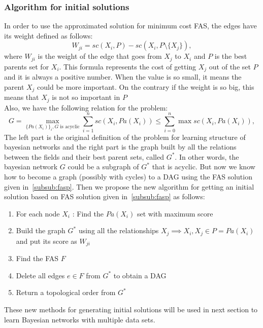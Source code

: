 \subsubsection{Algorithm for initial solutions}
\label{subsub:fasalgorithm}
	In order to use the approximated solution for minimum cost FAS, the edges have its weight defined as follows:
		\begin{equation}
			\label{eq:weight}
			W_{ji} = {sc}( X_i , P ) - {sc}( X_i , P \setminus \{ X_j \} ) ,
		\end{equation}
	where $W_{ji}$ is the weight of the edge that goes from $X_j$ to $X_i$ and $P$ is the best parents set for $X_i$. This formula represents the cost of getting $X_j$ out of the set $P$ and it is always a positive number. When the value is so small, it means the parent $X_j$ could be more important. On the contrary if the weight is so big, this means that $X_j$ is not so important in $P$\\
	Also, we have the following relation for the problem:
		\begin{equation}
			\label{eq:reduction}
			G = \max_{\{ {Pa}(X_i)\}_i, G \text{ is acyclic}} \sum_{i=1}^n {sc}( X_i , {Pa}( X_i ) ) \leq \sum_{i=0}^{n} \max {sc}( X_i , {Pa}( X_i ) ) ,
		\end{equation}
	The left part is the original definition of the problem for learning structure of bayesian networks and the right part is the graph built by all the relations between the fields and their best parent sets, called $G^*$. In other words, the bayesian network $G$ could be a subgraph of $G^*$ that is acyclic. But now we know how to become a graph (possibly with cycles) to a DAG using the FAS solution given in~\ref{subsub:fasp}.
	Then we propose the new algorithm for getting an initial solution based on FAS solution given in~\ref{subsub:fasp} as follows:
	\begin{enumerate}
		\item For each node $X_i$ : Find the ${Pa}( X_i )$ set with maximum score
		\item Build the graph $G^*$ using all the relationships $X_j \implies X_i, X_j \in P = {Pa}( X_i )$ and put its score as $W_{ji}$
		\item Find the FAS $F$
		\item Delete all edges $e \in F$ from $G^*$ to obtain a DAG
		\item Return a topological order from $G^*$
	\end{enumerate}

These new methods for generating initial solutions will be used in next section to learn Bayesian networks with multiple data sets.